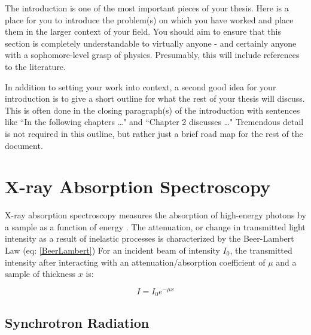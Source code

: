 
The introduction is one of the most important pieces of your thesis.  Here is a place for you to introduce the problem(s) on which you have worked and place them in the larger context of your field.  You should aim to ensure that this section is completely understandable to virtually anyone - and certainly anyone with a sophomore-level grasp of physics.  Presumably, this will include references to the literature.

In addition to setting your work into context, a second good idea for your introduction is to give a short outline for what the rest of your thesis will discuss.  This is often done in the closing paragraph(s) of the introduction with sentences like ``In the following chapters \ldots " and ``Chapter 2 discusses \ldots"  Tremendous detail is not required in this outline, but rather just a brief road map for the rest of the document.

\section{X-ray Absorption Spectroscopy}

X-ray absorption spectroscopy measures the absorption of high-energy photons by a sample as a function of energy \cite{gardenghi2012synchrotron}. The attenuation, or change in transmitted light intensity as a result of inelastic processes is characterized by the Beer-Lambert Law (eq: \ref{BeerLambert}) For an incident beam of intensity $I_0$, the transmitted intensity after interacting with an attenuation/absorption  coefficient of $ \mu $ and a sample of thickness $ x $ is:


\begin{equation}
    \label{BeerLambert}
    I = I_0 e^{-\mu x}
\end{equation}

\subsection{Synchrotron Radiation}

